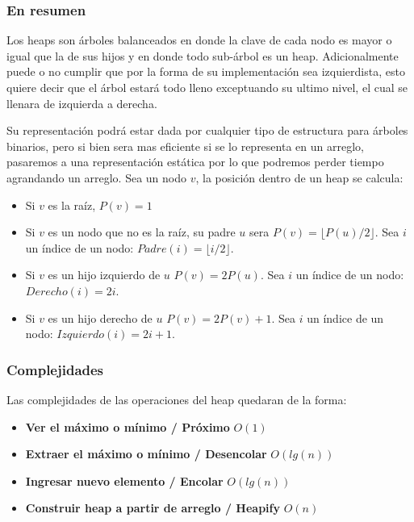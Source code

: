
\subsubsection{En resumen}

Los heaps son \'arboles balanceados en donde la clave de cada nodo es mayor o igual que la de sus hijos y en donde todo sub-\'arbol es un heap. Adicionalmente puede o no cumplir que por la forma de su implementaci\'on sea izquierdista, esto quiere decir que el \'arbol estar\'a todo lleno exceptuando su ultimo nivel, el cual se llenara de izquierda a derecha.

Su representaci\'on podr\'a estar dada por cualquier tipo de estructura para \'arboles binarios, pero si bien sera mas eficiente si se lo representa en un arreglo, pasaremos a una representaci\'on est\'atica por lo que podremos perder tiempo agrandando un arreglo. Sea un nodo $v$, la posici\'on dentro de un heap se calcula:

\begin{itemize}
 \item Si $v$ es la ra\'iz, $P(v) = 1$
 \item Si $v$ es un nodo que no es la ra\'iz, su padre $u$ sera $P(v) = \lfloor P(u)/2\rfloor$. Sea $i$ un \'indice de un nodo: $Padre(i) = \lfloor i/2\rfloor$.
 \item Si $v$ es un hijo izquierdo de $u$ $P(v) = 2P(u)$. Sea $i$ un \'indice de un nodo: $Derecho(i) = 2i$.
 \item Si $v$ es un hijo derecho de $u$ $P(v) = 2P(v)+1$. Sea $i$ un \'indice de un nodo: $Izquierdo(i) = 2i+1$.
\end{itemize}

\subsubsection{Complejidades}
Las complejidades de las operaciones del heap quedaran de la forma:

\begin{itemize}
 \item \textbf{Ver el m\'aximo o m\'inimo / Pr\'oximo} $O(1)$
 \item \textbf{Extraer el m\'aximo o m\'inimo / Desencolar} $O(lg(n))$
 \item \textbf{Ingresar nuevo elemento / Encolar} $O(lg(n))$
 \item \textbf{Construir heap a partir de arreglo / Heapify} $O(n)$
\end{itemize}

